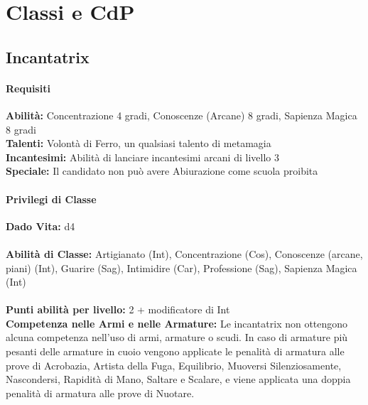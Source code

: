 \documentclass[a4paper]{report}
\begin{document}
\chapter{Classi e CdP}
\begin{multicols}{2}
\section{Incantatrix}

\subsubsection*{Requisiti}
\textbf{Abilità:} Concentrazione 4 gradi, Conoscenze (Arcane) 8 gradi, Sapienza Magica 8 gradi\\
\textbf{Talenti:} Volontà di Ferro, un qualsiasi talento di metamagia\\
\textbf{Incantesimi:} Abilità di lanciare incantesimi arcani di livello 3\\
\textbf{Speciale:} Il candidato non può avere Abiurazione come scuola proibita\\
\subsubsection*{Privilegi di Classe}
\textbf{Dado Vita:} d4\\
\\
\textbf{Abilità di Classe:} Artigianato (Int), Concentrazione (Cos), Conoscenze (arcane, piani) (Int), Guarire (Sag), Intimidire (Car), Professione (Sag), Sapienza Magica (Int)\\
\\
\textbf{Punti abilità per livello:} 2 + modificatore di Int\\

\textbf{Competenza nelle Armi e nelle Armature:} Le incantatrix non ottengono alcuna competenza nell'uso di armi, armature o scudi. In caso di armature più pesanti delle armature in cuoio vengono applicate le penalità di armatura alle prove di Acrobazia, Artista della Fuga, Equilibrio, Muoversi Silenziosamente, Nascondersi, Rapidità di Mano, Saltare e Scalare, e viene applicata una doppia penalità di armatura alle prove di Nuotare.\\


\end{multicols}
\end{document}

